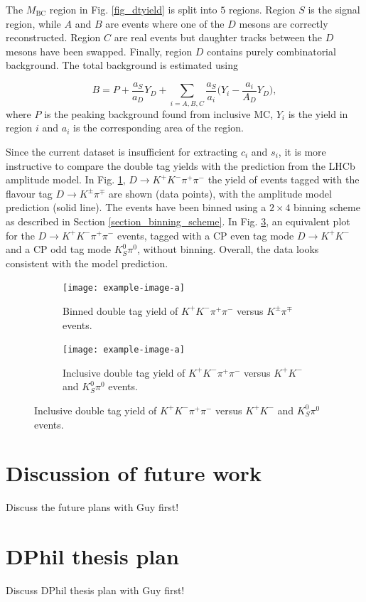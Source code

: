 \documentclass[12pt, a4paper, notitlepage, onecolumn]{article}
\numberwithin{equation}{section}
\begin{document}
The $M_\text{BC}$ region in Fig. \ref{fig_dtyield} is split into $5$ regions. Region $S$ is the signal region, while $A$ and $B$ are events where one of the $D$ mesons are correctly reconstructed. Region $C$ are real events but daughter tracks between the $D$ mesons have been swapped. Finally, region $D$ contains purely combinatorial background. The total background is estimated using

\begin{equation*}
  B = P + \frac{a_S}{a_D}Y_D + \sum_{i = A, B, C}\frac{a_S}{a_i}\Big(Y_i - \frac{a_i}{A_D}Y_D\Big),
\end{equation*}
where $P$ is the peaking background found from inclusive MC, $Y_i$ is the yield in region $i$ and $a_i$ is the corresponding area of the region.

Since the current dataset is insufficient for extracting $c_i$ and $s_i$, it is more instructive to compare the double tag yields with the prediction from the LHCb amplitude model. In Fig. \ref{fig_flavour_yield}, $D\to K^+K^-\pi^+\pi^-$ the yield of events tagged with the flavour tag $D\to K^\pm\pi^\mp$ are shown (data points), with the amplitude model prediction (solid line). The events have been binned using a $2\times 4$ binning scheme as described in Section \ref{section_binning_scheme}. In Fig. \ref{fig_cp_yield}, an equivalent plot for the $D\to K^+K^-\pi^+\pi^-$ events, tagged with a CP even tag mode $D\to K^+K^-$ and a CP odd tag mode $K_S^0\pi^0$, without binning. Overall, the data looks consistent with the model prediction.

\begin{figure}[H] 
  \centering
  \begin{subfigure}{0.5\textwidth}
    \centering
    \texttt{[image: example-image-a]}
    \caption{Binned double tag yield of $K^+K^-\pi^+\pi^-$ versus $K^\pm\pi^\mp$ events.}
    \label{fig_flavour_yield}
  \end{subfigure}%
  \begin{subfigure}{0.5\textwidth}
    \centering
    \texttt{[image: example-image-a]}
  \caption{Inclusive double tag yield of $K^+K^-\pi^+\pi^-$ versus $K^+K^-$ and $K_S^0\pi^0$ events.}
    \label{fig_cp_yield}
  \end{subfigure}
\end{figure}

\section{Discussion of future work}
\noindent Discuss the future plans with Guy first!





\newpage
\section{DPhil thesis plan}
\noindent Discuss DPhil thesis plan with Guy first!
\end{document}
